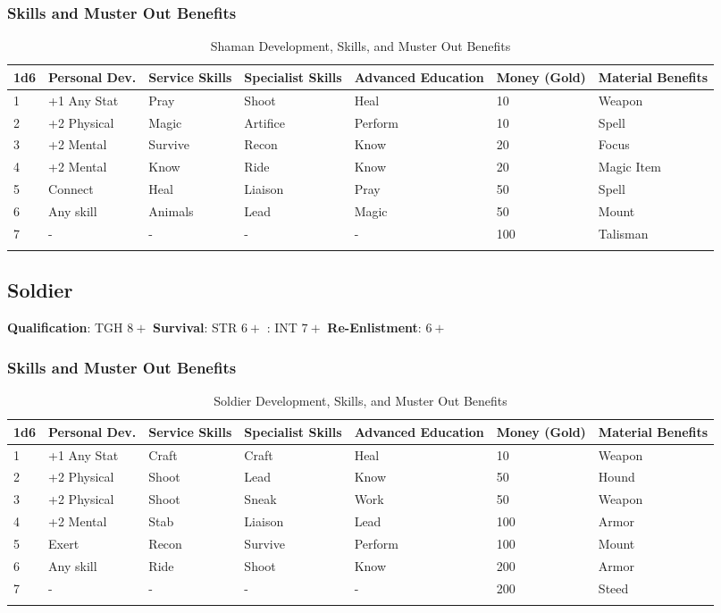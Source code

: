 \documentclass[itdr/core]{subfiles}
\begin{document}
\subsubsection{Skills and Muster Out Benefits}
\begin{longtable}{p{} p{} p{} p{} p{} p{} p{}}
\hline
\textbf{1d6} & \textbf{Personal Dev.} & \textbf{Service Skills} & \textbf{Specialist Skills} & \textbf{Advanced Education} & \textbf{Money (Gold)} & \textbf{Material Benefits} \\
\hline
1 & +1 Any Stat & Pray & Shoot & Heal & 10 & Weapon \\
2 & +2 Physical & Magic & Artifice & Perform & 10 & Spell \\
3 & +2 Mental & Survive & Recon & Know & 20 & Focus \\
4 & +2 Mental & Know & Ride & Know & 20 & Magic Item \\
5 & Connect & Heal & Liaison & Pray & 50 & Spell \\
6 & Any skill & Animals & Lead & Magic & 50 & Mount \\
7 & - & - & - & - & 100 & Talisman \\
\hline
\caption{Shaman Development, Skills, and Muster Out Benefits}
\end{longtable}

\subsection{Soldier}
\textbf{Qualification}: TGH $8+$
\textbf{Survival}: STR $6+$
: INT $7+$
\textbf{Re-Enlistment}: $6+$
\subsubsection{Skills and Muster Out Benefits}
\begin{longtable}{p{} p{} p{} p{} p{} p{} p{}}
\hline
\textbf{1d6} & \textbf{Personal Dev.} & \textbf{Service Skills} & \textbf{Specialist Skills} & \textbf{Advanced Education} & \textbf{Money (Gold)} & \textbf{Material Benefits} \\
\hline
1 & +1 Any Stat & Craft & Craft & Heal & 10 & Weapon \\
2 & +2 Physical & Shoot & Lead & Know & 50 & Hound \\
3 & +2 Physical & Shoot & Sneak & Work & 50 & Weapon \\
4 & +2 Mental & Stab & Liaison & Lead & 100 & Armor \\
5 & Exert & Recon & Survive & Perform & 100 & Mount \\
6 & Any skill & Ride & Shoot & Know & 200 & Armor \\
7 & - & - & - & - & 200 & Steed \\
\hline
\caption{Soldier Development, Skills, and Muster Out Benefits}
\end{longtable}
\end{document}
